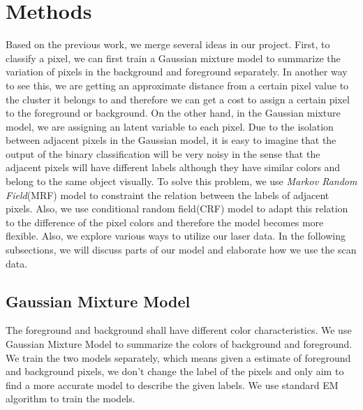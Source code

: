 \documentclass{article} %
\begin{document}
\section{Methods}
Based on the previous work, we merge several ideas in our
project. First, to classify a pixel, we can first train a Gaussian
mixture model to summarize the variation of pixels in the background
and foreground separately. In another way to see this, we are getting
an approximate distance from a certain pixel value to the cluster it
belongs to and therefore we can get a cost to assign a certain pixel
to the foreground or background. On the other hand, in the Gaussian
mixture model, we are assigning an latent variable to each pixel. Due
to the isolation between adjacent pixels in the Gaussian model, it is
easy to imagine that the output of the binary classification will be
very noisy in the sense that the adjacent pixels will have different
labels although they have similar colors and belong to the same object
visually. To solve this problem, we use \emph{Markov Random
  Field}(MRF) model to constraint the relation between the labels of
adjacent pixels. Also, we use conditional random field(CRF) model to
adapt this relation to the difference of the pixel colors and
therefore the model becomes more flexible. Also, we explore various
ways to utilize our laser data. In the following subsections, we will
discuss parts of our model and elaborate how we use the scan data.
\subsection{Gaussian Mixture Model}
The foreground and background shall have different color
characteristics. We use Gaussian Mixture Model to summarize the colors
of background and foreground. We train the two models separately,
which means given a estimate of foreground and background pixels, we
don't change the label of the pixels and only aim to find a more
accurate model to describe the given labels. We use standard EM
algorithm to train the models.
\end{document}

